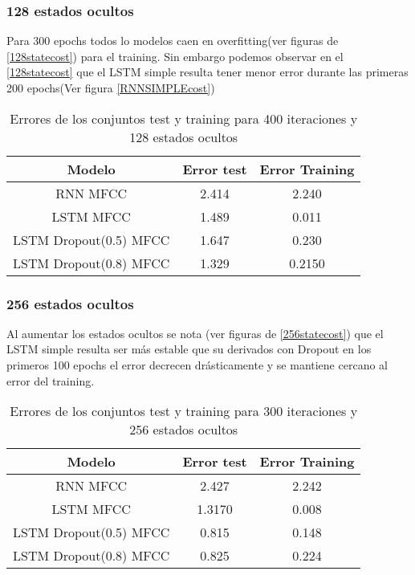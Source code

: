 \subsubsection{128 estados ocultos}
Para 300 epochs todos lo modelos caen en overfitting(ver figuras de \ref{128statecost}) para el training. Sin embargo podemos observar en el \ref{128statecost} que el LSTM simple resulta tener menor error durante las primeras 200 epochs(Ver figura \ref{RNNSIMPLEcost})
\begin{table}[H]
	\centering
	\begin{tabular}{|c|c|c|}
		\hline
		\rowcolor{Gray}  Modelo & Error test& Error Training \\ \hline
		RNN MFCC&        2.414  &             2.240      \\ \hline
		LSTM MFCC&        1.489  &          0.011       \\ \hline
		LSTM Dropout(0.5) MFCC& 1.647         &     0.230          \\ \hline
		LSTM Dropout(0.8) MFCC&	1.329		&	0.2150	\\ \hline
	\end{tabular}
	\caption{Errores de los conjuntos test y training para 400 iteraciones y 128 estados ocultos}
\end{table}
\subsubsection{256 estados ocultos}
Al aumentar los estados ocultos se nota (ver figuras de \ref{256statecost}) que el LSTM simple resulta ser más estable que su derivados con Dropout en los primeros 100 epochs el error decrecen drásticamente y se mantiene cercano al error del training.
\begin{table}[H]
	\centering
	\begin{tabular}{|c|c|c|}
		\hline
		\rowcolor{Gray}  Modelo & Error test& Error Training \\ \hline
		RNN MFCC&        2.427 &             2.242     \\ \hline
		LSTM MFCC&        1.3170  &          0.008    \\ \hline
		LSTM Dropout(0.5) MFCC&  0.815       &     0.148        \\ \hline
		LSTM Dropout(0.8) MFCC&	0.825		&	0.224	\\ \hline
	\end{tabular}
	\caption{Errores de los conjuntos test y training para 300 iteraciones y 256 estados ocultos}
\end{table}

